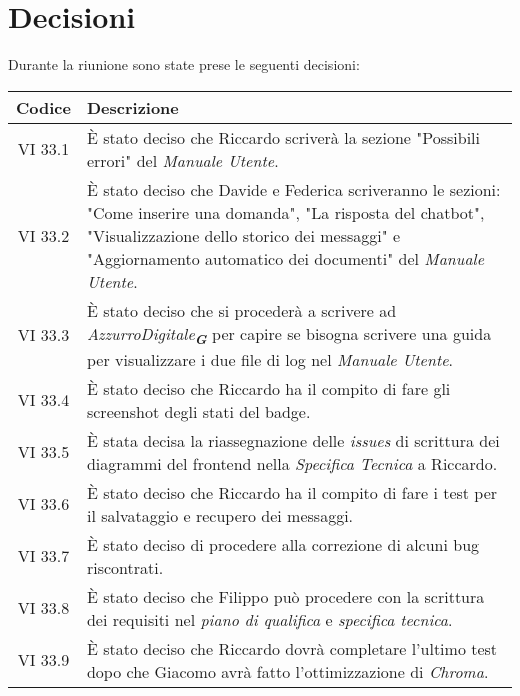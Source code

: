 
\section{Decisioni}

Durante la riunione sono state prese le seguenti decisioni:

\vspace{0.5cm}

\begin{table}[htbp]
    \centering
    \begin{tabular}{|c|p{}|}
        \hline
        \rowcolor[gray]{0.75}
        \textbf{Codice} & \textbf{Descrizione}\\
        \hline
        VI 33.1 & È stato deciso che Riccardo scriverà la sezione "Possibili errori" del \emph{Manuale Utente}.\\
        \hline
        VI 33.2 & È stato deciso che Davide e Federica scriveranno le sezioni: "Come inserire una domanda", "La risposta del chatbot", "Visualizzazione dello storico dei messaggi" e "Aggiornamento automatico dei documenti" del \emph{Manuale Utente}.\\
        \hline
        VI 33.3 & È stato deciso che si procederà a scrivere ad \emph{AzzurroDigitale}\textsubscript{\textit{\textbf{G}}} per capire se bisogna scrivere una guida per visualizzare i due file di log nel \emph{Manuale Utente}.\\
        \hline 
        VI 33.4 & È stato deciso che Riccardo ha il compito di fare gli screenshot degli stati del badge.\\
        \hline
        VI 33.5 & È stata decisa la riassegnazione delle \emph{issues} di scrittura dei diagrammi del frontend nella \emph{Specifica Tecnica} a Riccardo.\\
        \hline
        VI 33.6 & È stato deciso che Riccardo ha il compito di fare i test per il salvataggio e recupero dei messaggi.\\
        \hline
        VI 33.7 & È stato deciso di procedere alla correzione di alcuni bug riscontrati.\\
        \hline
        VI 33.8 & È stato deciso che Filippo può procedere con la scrittura dei requisiti nel \emph{piano di qualifica} e \emph{specifica tecnica}.\\
        \hline
        VI 33.9 & È stato deciso che Riccardo dovrà completare l'ultimo test dopo che Giacomo avrà fatto l'ottimizzazione di \emph{Chroma}. \\

\end{tabular}
\end{table}
